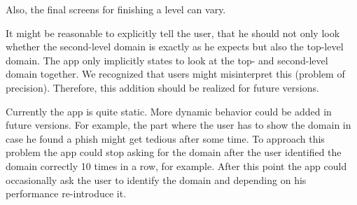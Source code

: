 \begin{description}[leftmargin=0cm]
	Also, the final screens for finishing a level can vary.
	\item[Top-Level Domain Attacks] It might be reasonable to explicitly tell the user, that he should not only look whether the second-level domain is exactly as he expects but also the top-level domain. The app only implicitly states to look at the top- and second-level domain together.
We recognized that users might misinterpret this (problem of precision).
Therefore, this addition should be realized for future versions.
	\item[Performance Dependent App Behavior] Currently the app is quite static.
More dynamic behavior could be added in future versions.
For example, the part where the user has to show the domain in case he found a phish might get tedious after some time.
To approach this problem the app could stop asking for the domain after the user identified the domain correctly 10 times in a row, for example.
After this point the app could occasionally ask the user to identify the domain and depending on his performance re-introduce it.
\end{description}

 

